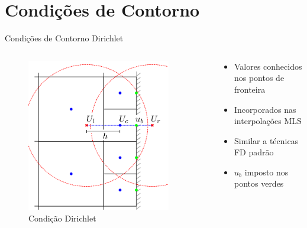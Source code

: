 \documentclass[../main/main.tex]{subfiles}
\begin{document}
\section{Condições de Contorno}

\begin{frame}{Condições de Contorno Dirichlet}
\begin{columns}[T]
\begin{column}{0.4\textwidth}
\begin{figure}
\centering
\includegraphics[width=0.9\textwidth]{imgs/figura3a.png}
\caption{Condição Dirichlet}
\end{figure}
\end{column}
\begin{column}{0.6\textwidth}
\begin{itemize}
\item Valores conhecidos nos pontos de fronteira
\item Incorporados nas interpolações MLS
\item Similar a técnicas FD padrão
\item $u_b$ imposto nos pontos verdes
\end{itemize}
\end{column}
\end{columns}
\end{frame}
\end{document}
